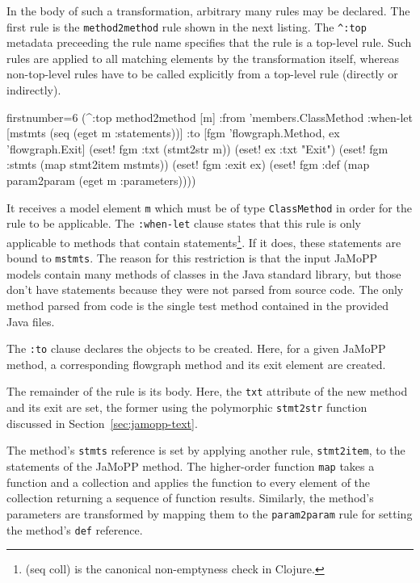 \documentclass[11pt]{article}
\begin{document}
In the body of such a transformation, arbitrary many rules may be declared.
The first rule is the \verb|method2method| rule shown in the next listing.  The
\verb|^:top| metadata preceeding the rule name specifies that the rule is a
top-level rule.  Such rules are applied to all matching elements by the
transformation itself, whereas non-top-level rules have to be called explicitly
from a top-level rule (directly or indirectly).

\begin{clojurecode*}{firstnumber=6}
  (^:top method2method [m]
         :from 'members.ClassMethod
         :when-let [mstmts (seq (eget m :statements))]
         :to [fgm 'flowgraph.Method, ex 'flowgraph.Exit]
         (eset! fgm :txt (stmt2str m))
         (eset! ex :txt "Exit")
         (eset! fgm :stmts (map stmt2item mstmts))
         (eset! fgm :exit ex)
         (eset! fgm :def (map param2param (eget m :parameters))))
\end{clojurecode*}

It receives a model element \verb|m| which must be of type \verb|ClassMethod|
in order for the rule to be applicable.  The \verb|:when-let| clause states
that this rule is only applicable to methods that contain
statements\footnote{\textsf{(seq coll)} is the canonical non-emptyness check in
  Clojure.}.  If it does, these statements are bound to \verb|mstmts|.  The
reason for this restriction is that the input JaMoPP models contain many
methods of classes in the Java standard library, but those don't have
statements because they were not parsed from source code.  The only method
parsed from code is the single test method contained in the provided Java
files.

The \verb|:to| clause declares the objects to be created.  Here, for a given
JaMoPP method, a corresponding flowgraph method and its exit element are
created.

The remainder of the rule is its body.  Here, the \verb|txt| attribute of the
new method and its exit are set, the former using the polymorphic
\verb|stmt2str| function discussed in Section~\ref{sec:jamopp-text}.

The method's \verb|stmts| reference is set by applying another rule,
\verb|stmt2item|, to the statements of the JaMoPP method.  The higher-order
function \verb|map| takes a function and a collection and applies the function
to every element of the collection returning a sequence of function results.
Similarly, the method's parameters are transformed by mapping them to the
\verb|param2param| rule for setting the method's \verb|def| reference.
\end{document}
